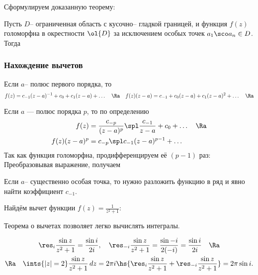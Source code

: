 \documentclass[a4paper]{article}
\begin{document}
Сформулируем доказанную теорему:

\begin{theorem}[о вычетах]
Пусть $D$-- ограниченная область с кусочно-- гладкой границей, и функция $f(z)$
голоморфна в окрестности $\ol{D}$ за исключением особых точек $a_1 \sco a_n \in D$. Тогда
\end{theorem}

\subsubsection{Нахождение вычетов}

 Если $a$-- полюс первого порядка, то
$$f(z)=c_{-1}(z-a)^{-1}+c_0+c_1(z-a)+\ldots \quad \Ra \quad f(z)(z-a)=c_{-1}+c_0(z-a)+c_1(z-a)^2 +\ldots \quad \Ra$$

 Если $a$ --- полюс порядка $p$, то по определению
\begin{align*}
f(z) &= \frac{c_{-p}}{(z-a)^p} \spl \frac{c_{-1}}{z-a}+c_0 + \ldots \quad \Ra\\
f(z)(z-a)^p &= c_{-p} \spl c_{-1}(z-a)^{p-1}+\ldots
\end{align*}
Так как функция голоморфна, продифференцируем её $(p-1)$ раз:
Преобразовывая выражение, получаем

 Если $a$-- существенно особая точка, то нужно разложить функцию в ряд и явно найти коэффициент $c_{-1}$.

\begin{ex}
Найдём вычет функции $f(z) = \frac{1}{z^2+1}$:
\end{ex}

\begin{ex}
\end{ex}

Теорема о вычетах позволяет легко вычислять интегралы.

\begin{ex}
\begin{multline*}
\res_i\frac{\sin z}{z^2+1}=\frac{\sin i}{2i}, \quad \res_{-i}\frac{\sin z}{z^2+1}=\frac{\sin -i}{2 (-i)}= \frac{\sin i}{2 i} \quad \Ra\\
\Ra \quad \ints{|z|=2}\frac{\sin z}{z^2+1}\,dz = 2\pi i\hs{\res_i\frac{\sin z}{z^2+1}+\res_{-i}\frac{\sin z}{z^2+1}}=2\pi\sin i.
\end{multline*}
\end{ex}
\end{document}
